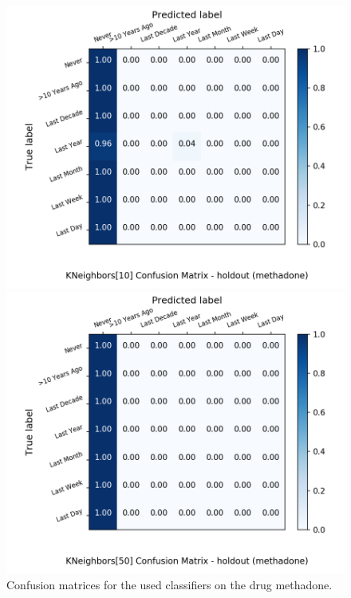\begin{figure}[H]
\begin{minipage}[b]{0.32\textwidth}
		\includegraphics[width=1.1\textwidth]{Plots/drugs/methadone_KNeighbors_10_balance_False_holdout.png}
  \end{minipage}
	\begin{minipage}[b]{0.32\textwidth}
		\includegraphics[width=1.1\textwidth]{Plots/drugs/methadone_KNeighbors_50_balance_False_holdout.png}
  \end{minipage}
	\caption{Confusion matrices for the used classifiers on the drug methadone.}
\end{figure}


